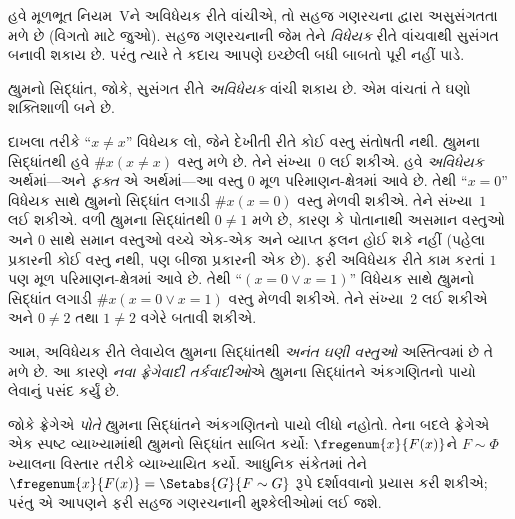 \documentclass[../../../include/open-logic-section]{subfiles}
\begin{document}
હવે મૂળભૂત નિયમ~Vને અવિધેયક રીતે વાંચીએ, તો
સહજ ગણરચના દ્વારા અસુસંગતતા મળે છે
(વિગતો માટે  જુઓ).
સહજ ગણરચનાની જેમ તેને \emph{વિધેયક} રીતે
વાંચવાથી સુસંગત બનાવી શકાય છે. પરંતુ ત્યારે તે
કદાચ આપણે ઇચ્છેલી બધી બાબતો પૂરી નહીં પાડે.

હ્યુમનો સિદ્ધાંત, જોકે, સુસંગત રીતે
\emph{અવિધેયક} વાંચી શકાય છે. એમ વાંચતાં તે
ઘણો શક્તિશાળી બને છે.

દાખલા તરીકે ``$x \neq x$'' વિધેયક લો, જેને
દેખીતી રીતે કોઈ વસ્તુ સંતોષતી નથી. હ્યુમના
સિદ્ધાંતથી હવે $\# x( x\neq x)$ વસ્તુ મળે છે.
તેને સંખ્યા~$0$ લઈ શકીએ. હવે \emph{અવિધેયક}
અર્થમાં---અને \emph{ફક્ત} એ અર્થમાં---આ વસ્તુ
$0$ મૂળ પરિમાણન-ક્ષેત્રમાં આવે છે. તેથી
``$x = 0$'' વિધેયક સાથે હ્યુમનો સિદ્ધાંત લગાડી
$\#x (x = 0)$ વસ્તુ મેળવી શકીએ. તેને સંખ્યા~$1$
લઈ શકીએ. વળી હ્યુમના સિદ્ધાંતથી $0 \neq 1$
મળે છે, કારણ કે પોતાનાથી અસમાન વસ્તુઓ અને $0$
સાથે સમાન વસ્તુઓ વચ્ચે એક-એક અને વ્યાપ્ત ફલન
હોઈ શકે નહીં (પહેલા પ્રકારની કોઈ વસ્તુ નથી, પણ
બીજા પ્રકારની એક છે). ફરી અવિધેયક રીતે કામ કરતાં
$1$ પણ મૂળ પરિમાણન-ક્ષેત્રમાં આવે છે. તેથી
``$(x = 0 \lor x = 1)$'' વિધેયક સાથે હ્યુમનો
સિદ્ધાંત લગાડી $\#x(x = 0 \lor x = 1)$ વસ્તુ
મેળવી શકીએ. તેને સંખ્યા~$2$ લઈ શકીએ અને
$0\neq 2$ તથા $1 \neq 2$ વગેરે બતાવી શકીએ.

આમ, અવિધેયક રીતે લેવાયેલ હ્યુમના સિદ્ધાંતથી
\emph{અનંત ઘણી વસ્તુઓ} અસ્તિત્વમાં છે તે મળે છે.
આ કારણે \emph{નવા ફ્રેગેવાદી તર્કવાદીઓ}એ
હ્યુમના સિદ્ધાંતને અંકગણિતનો પાયો લેવાનું પસંદ કર્યું છે.

જોકે ફ્રેગેએ \emph{પોતે} હ્યુમના સિદ્ધાંતને
અંકગણિતનો પાયો લીધો નહોતો. તેના બદલે ફ્રેગેએ
એક સ્પષ્ટ વ્યાખ્યામાંથી હ્યુમનો સિદ્ધાંત સાબિત
કર્યો: $\fregenum{x}{F(x)}$ને $F \sim \Phi$
ખ્યાલના વિસ્તાર તરીકે વ્યાખ્યાયિત કર્યો.
આધુનિક સંકેતમાં તેને
$\fregenum{x}{F(x)} = \Setabs{G}{F \sim G}$
રૂપે દર્શાવવાનો પ્રયાસ કરી શકીએ; પરંતુ એ આપણને
ફરી સહજ ગણરચનાની મુશ્કેલીઓમાં લઈ જશે.
\end{document}
